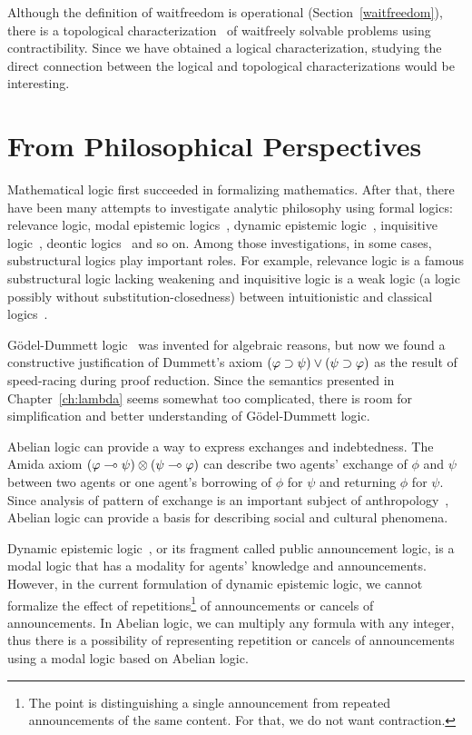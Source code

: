 Although the definition of waitfreedom is operational
(Section~\ref{waitfreedom}),
there is a topological characterization~\citep{Herlihy99,Saks:1993vq} of
waitfreely solvable problems using contractibility.
Since we have obtained a logical characterization, studying the direct
connection between the logical and topological characterizations would
be interesting.

\section{From Philosophical Perspectives}

Mathematical logic first succeeded in formalizing mathematics.
After that, there have been many attempts to investigate analytic
philosophy
using formal logics: relevance logic, modal epistemic
logics~\citep{sep-logic-epistemic},
dynamic epistemic logic~\citep{ditmarsch2007dynamic},
inquisitive logic~\citep{ciardelli2011},
deontic logics~\citep{von1951deontic} and
so on.  Among those investigations, in some cases, substructural logics
play important roles.  For example, relevance logic is a famous
substructural logic lacking weakening and inquisitive logic is a weak
logic (a logic possibly without substitution-closedness) between
intuitionistic and classical logics~\citep{ciardelli2011}.

G\"odel-Dummett logic~\citep{dummett59} was invented for algebraic
reasons, but now we found a constructive justification of Dummett's axiom
$(\varphi\supset\psi)\lor(\psi\supset\varphi)$ as the result of speed-racing during
proof reduction.  Since the semantics presented in
Chapter~\ref{ch:lambda} seems somewhat too complicated,
there is room for simplification and better understanding of
G\"odel-Dummett logic.

Abelian logic can provide a way to express
exchanges and indebtedness.
The Amida axiom $(\varphi\multimap
\psi)\otimes(\psi\multimap\varphi)$
can describe two agents' exchange of $\phi$ and $\psi$ between two agents
or one agent's borrowing of $\phi$ for $\psi$ and returning $\phi$ for
$\psi$.
Since analysis of pattern of exchange is an important subject of
anthropology~\citep{kula1920}, Abelian logic can provide a
basis for describing social and cultural phenomena.

Dynamic epistemic logic~\citep{ditmarsch2007dynamic}, or its fragment
called public announcement
logic, is a modal logic that has a modality for agents' knowledge and
announcements.  However, in the current formulation of dynamic epistemic
logic, we cannot formalize the effect of repetitions\footnote{The point
is distinguishing a single announcement from repeated announcements of
the same content.  For that, we do not want contraction.} of announcements or
cancels of announcements.  In Abelian logic, we can multiply any formula
with any integer, thus there is a possibility of representing repetition
or cancels of announcements using a modal logic based on Abelian logic.


